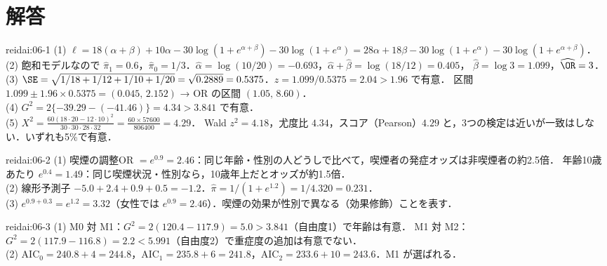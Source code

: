 \section{解答}\label{sec:06-sol}
\begin{kaitou}{reidai:06-1}
(1) $\ell=18(\alpha+\beta)+10\alpha-30\log(1+e^{\alpha+\beta})-30\log(1+e^\alpha)=28\alpha+18\beta-30\log(1+e^\alpha)-30\log(1+e^{\alpha+\beta})$．\\
(2) 飽和モデルなので $\hat\pi_1=0.6$，$\hat\pi_0=1/3$．$\hat\alpha=\log(10/20)=-0.693$，$\hat\alpha+\hat\beta=\log(18/12)=0.405$，
$\hat\beta=\log3=1.099$，$\widehat{\OR}=3$．\\
(3) $\SE=\sqrt{1/18+1/12+1/10+1/20}=\sqrt{0.2889}=0.5375$．$z=1.099/0.5375=2.04>1.96$ で有意．
区間 $1.099\pm1.96\times0.5375=(0.045,\,2.152)$ → OR の区間 $(1.05,\,8.60)$．\\
(4) $G^2=2\{-39.29-(-41.46)\}=4.34>3.841$ で有意．\\
(5) $X^2=\frac{60(18\cdot20-12\cdot10)^2}{30\cdot30\cdot28\cdot32}=\frac{60\times57600}{806400}=4.29$．
Wald $z^2=4.18$，尤度比 $4.34$，スコア（Pearson）$4.29$ と，3つの検定は近いが一致はしない．いずれも5\%で有意．
\end{kaitou}

\begin{kaitou}{reidai:06-2}
(1) 喫煙の調整OR $=e^{0.9}=2.46$：同じ年齢・性別の人どうしで比べて，喫煙者の発症オッズは非喫煙者の約2.5倍．
年齢10歳あたり $e^{0.4}=1.49$：同じ喫煙状況・性別なら，10歳年上だとオッズが約1.5倍．\\
(2) 線形予測子 $-5.0+2.4+0.9+0.5=-1.2$．$\hat\pi=1/(1+e^{1.2})=1/4.320=0.231$．\\
(3) $e^{0.9+0.3}=e^{1.2}=3.32$（女性では $e^{0.9}=2.46$）．喫煙の効果が性別で異なる（効果修飾）ことを表す．
\end{kaitou}

\begin{kaitou}{reidai:06-3}
(1) M0 対 M1：$G^2=2(120.4-117.9)=5.0>3.841$（自由度1）で年齢は有意．
M1 対 M2：$G^2=2(117.9-116.8)=2.2<5.991$（自由度2）で重症度の追加は有意でない．\\
(2) $\mathrm{AIC}_0=240.8+4=244.8$，$\mathrm{AIC}_1=235.8+6=241.8$，$\mathrm{AIC}_2=233.6+10=243.6$．M1 が選ばれる．
\end{kaitou}

